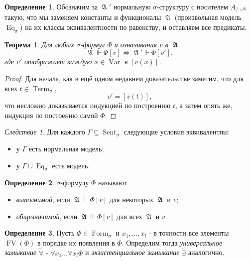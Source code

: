 \documentclass[a4paper,100pt]{article}
\theoremstyle{indented}
\newtheorem{theorem}{Теорема}
\theoremstyle{definition}
\newtheorem{defn}{Определение}
\theoremstyle{remark}
\newtheorem{cons}{Следствие}
\DeclareMathOperator{\Llra}{\Longleftrightarrow}
\DeclareMathOperator{\form}{Form}
\DeclareMathOperator{\Var}{Var}
\DeclareMathOperator{\Term}{Term}
\DeclareMathOperator{\FV}{FV}
\DeclareMathOperator{\Sent}{Sent}
\DeclareMathOperator{\Eq}{Eq}
\DeclareMathOperator{\GA}{\mathfrak{A}}
\begin{document}
\begin{defn}
  Обозначим за $\GA'$ нормальную $\sigma$-структуру с носителем $A_{/=^{\GA}}$ такую, что мы заменяем константы и функционалы $\GA$ (произвольная модель $\Eq_\sigma$) на их классы эквивалентности по равенству, и оставляем все предикаты.
\end{defn}

\begin{theorem}
  Для любых $\sigma$-формул $\Phi$ и означивания $v$ в $\GA$ 
  \[
    \GA \Vdash \Phi[v] \Llra \GA'\Vdash \Phi[v'], 
  \]
  где $v'$ отображает каждую $x\in \Var$ в $[v(x)]$. 
\end{theorem}

\begin{proof}
  Для начала, как в ещё одном недавнем доказательстве заметим, что для всех $t\in \Term_\sigma$, 
  \[
    \overline{v}'=[\overline{v}(t)],
  \]
  что несложно доказывается индукцией по построению $t$, а затем опять же, индукция по постоению самой $\Phi$. 
\end{proof}

\begin{cons}
  Для каждого $\Gamma\subseteq \Sent_\sigma$ следующие условия эквивалентны: 

  \begin{itemize}
    \item у $\Gamma$ есть нормальная модель; 
    \item у $\Gamma \cup \Eq_\sigma$ есть модель.
  \end{itemize}
\end{cons}

\begin{defn}
  $\sigma$-формулу $\Phi$ называют 

  \begin{itemize}
    \item \textit{выполнимой}, если $\GA \Vdash \Phi[v]$ для некоторых $\GA$ и $v$; 
    \item \textit{общезначимой}, если $\GA\Vdash \Phi[v]$ для всех $\GA$ и $v$. 
  \end{itemize}
\end{defn}

\begin{defn}
  Пусть $\Phi \in \form_\sigma$ и $x_1, \ldots, x_l$ - в точности все элементы $\FV(\Phi)$ в порядке их появления в $\Phi$. Определим тогда \textit{универсальное замыкание} $\tilde{\forall}$ - $\forall x_1 \ldots \forall x_l \Phi$ и \textit{экзистенциальное замыкание} $\tilde{\exists}$ аналогично.
\end{defn}
\end{document}
